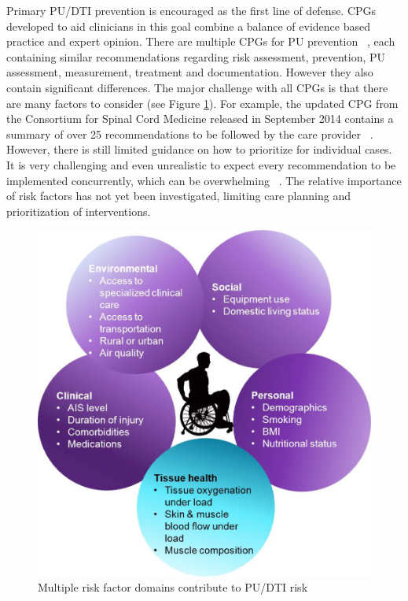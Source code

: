 \documentclass{amia}
\begin{document}
Primary PU/DTI prevention is encouraged as the first line of defense. CPGs developed to aid clinicians in this goal combine a balance of evidence based practice and expert opinion. There are multiple CPGs for PU prevention ~\cite{cpg1, cpg2, cpg3, cpg4}, each containing similar recommendations regarding risk assessment, prevention, PU assessment, measurement, treatment and documentation. However they also contain significant differences. The major challenge with all CPGs is that there are many factors to consider (see Figure \ref{risk_factors}). For example, the updated CPG from the Consortium for Spinal Cord Medicine released in September 2014 contains a summary of over 25 recommendations to be followed by the care provider ~\cite{cpg5}. However, there is still limited guidance on how to prioritize for individual cases. It is very challenging and even unrealistic to expect every recommendation to be implemented concurrently, which can be overwhelming ~\cite{ref3}. The relative importance of risk factors has not yet been investigated, limiting care planning and prioritization of interventions.

\begin{figure}
  \begin{center}
    \includegraphics[scale=0.5]{pics/risk_factors.png}
  \end{center}
  \caption{Multiple risk factor domains contribute to PU/DTI risk}
  \label{risk_factors}
\end{figure}
\end{document}

